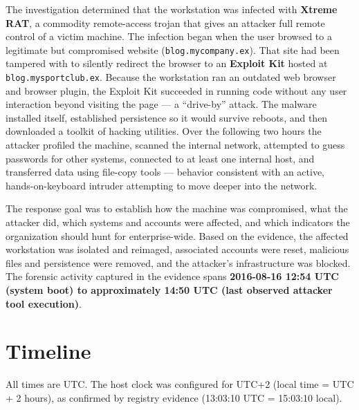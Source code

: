 \documentclass[12pt]{article}
\begin{document}
The investigation determined that the workstation was infected with \textbf{Xtreme RAT}, a commodity remote-access trojan that gives an attacker full remote control of a victim machine. The infection began when the user browsed to a legitimate but compromised website (\texttt{blog.mycompany.ex}). That site had been tampered with to silently redirect the browser to an \textbf{Exploit Kit} hosted at \texttt{blog.mysportclub.ex}. Because the workstation ran an outdated web browser and browser plugin, the Exploit Kit succeeded in running code without any user interaction beyond visiting the page --- a ``drive-by'' attack. The malware installed itself, established persistence so it would survive reboots, and then downloaded a toolkit of hacking utilities. Over the following two hours the attacker profiled the machine, scanned the internal network, attempted to guess passwords for other systems, connected to at least one internal host, and transferred data using file-copy tools --- behavior consistent with an active, hands-on-keyboard intruder attempting to move deeper into the network.

The response goal was to establish how the machine was compromised, what the attacker did, which systems and accounts were affected, and which indicators the organization should hunt for enterprise-wide. Based on the evidence, the affected workstation was isolated and reimaged, associated accounts were reset, malicious files and persistence were removed, and the attacker's infrastructure was blocked. The forensic activity captured in the evidence spans \textbf{2016-08-16 12:54 UTC (system boot) to approximately 14:50 UTC (last observed attacker tool execution)}.

\section{Timeline}

All times are UTC. The host clock was configured for UTC+2 (local time = UTC + 2 hours), as confirmed by registry evidence (13:03:10 UTC = 15:03:10 local).
\end{document}
